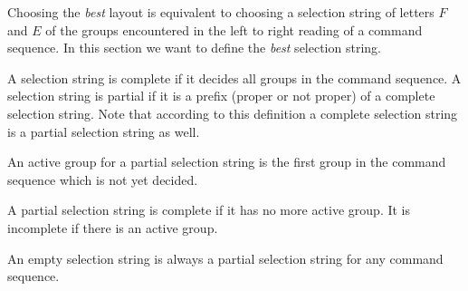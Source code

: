 \documentclass[12pt]{article}
\begin{document}
Choosing the \emph{best} layout is equivalent to choosing a selection string
of letters $F$ and $E$ of the groups encountered in the left to right reading
of a command sequence. In this section we want to define the \emph{best}
selection string.

A selection string is complete if it decides all groups in the command
sequence. A selection string is partial if it is a prefix (proper or not
proper) of a complete selection string. Note that according to this definition
a complete selection string is a partial selection string as well.

An active group for a partial selection string is the first group in the
command sequence which is not yet decided.

A partial selection string is complete if it has no more active group. It is
incomplete if there is an active group.

An empty selection string is always a partial selection string for any command
sequence.
\end{document}
